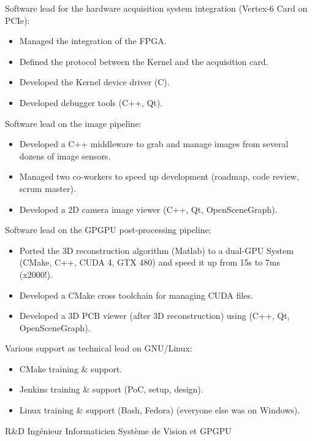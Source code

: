 \documentclass{article}
\begin{document}
\begin{llist}
{%
Software lead for the hardware acquisition system integration (Vertex-6 Card on PCIe):
\vspace{-0.33cm}
\begin{itemize}
	\item Managed the integration of the FPGA.
	\item Defined the protocol between the Kernel and the acquisition card.
	\item Developed the Kernel device driver (C).
	\item Developed debugger tools (C++, Qt).
\end{itemize}
Software lead on the image pipeline:
\vspace{-0.33cm}
\begin{itemize}
	\item Developed a C++ middleware to grab and manage images from several dozens of image sensors.
	\item Managed two co-workers to speed up development (roadmap, code review, scrum master).
	\item Developed a 2D camera image viewer (C++, Qt, OpenSceneGraph).
\end{itemize}
Software lead on the GPGPU post-processing pipeline:
\vspace{-0.33cm}
\begin{itemize}
	\item Ported the 3D reconstruction algorithm (Matlab) to a dual-GPU System (CMake, C++, CUDA 4, GTX 480)
		and speed it up from 15s to 7ms (x2000!).
	\item Developed a CMake cross toolchain for managing CUDA files.
	\item Developed a 3D PCB viewer (after 3D reconstruction) using (C++, Qt, OpenSceneGraph).
\end{itemize}

Various support as technical lead on GNU/Linux:
\vspace{-0.33cm}
\begin{itemize}
	\item CMake training \& support.
	\item Jenkins training \& support (PoC, setup, design).
	\item Linux training \& support (Bash, Fedora) (everyone else was on Windows).
\end{itemize}
} {
R\&D Ing\'{e}nieur Informaticien Syst\`{e}me de Vision et GPGPU\\
\vspace{-0.33cm}

}
\end{llist}
\end{document}
